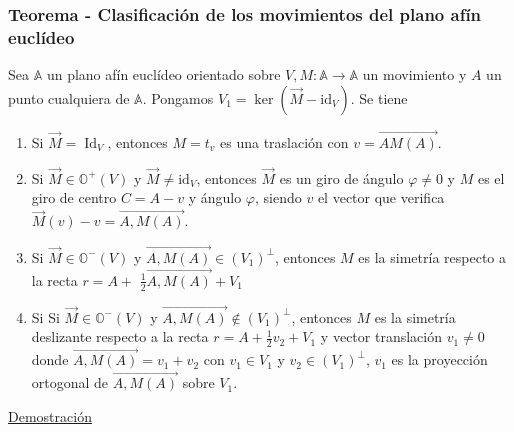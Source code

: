 \documentclass[12pt, a4paper, ones, notitlepage, openany,titlepage]{article}
\newcommand{\demostracion}{\noindent\underline{Demostración}}
\begin{document}
\subsubsection{Teorema - Clasificación de los movimientos del plano afín euclídeo}
Sea $\mathbb{A}$ un plano afín euclídeo orientado sobre $V, M: \mathbb{A} \rightarrow \mathbb{A}$ un movimiento y $A$ un punto cualquiera de $\mathbb{A}$. Pongamos $V_{1}=\ker\left(\overrightarrow{M}-\mathrm{id}_{V}\right)$. Se tiene
\begin{enumerate}[label=(\arabic*)]
	
\item Si $\overrightarrow{M}=\operatorname{Id}_{V}$, entonces $M=t_{v}$ es una traslación con $v=\overrightarrow{A M(A)}$.

\item Si $\overrightarrow{M} \in \mathbb{O}^{+}(V)$ y $\overrightarrow{M} \neq \mathrm{id}_{V}$, entonces $\overrightarrow{M}$ es un giro de ángulo $\varphi \neq 0$ y $M$ es el giro de centro $C=A-v$ y ángulo $\varphi$, siendo $v$ el vector que verifica $\overrightarrow{M}(v)-v=\overrightarrow{A,M(A)}$.

\item Si $\overrightarrow{M} \in \mathbb{O}^{-}(V)$ y $\overrightarrow{A,M(A)} \in\left(V_{1}\right)^{\perp}$, entonces $M$ es la simetría respecto a la recta $r=A+$ $\frac{1}{2} \overrightarrow{A,M(A)}+V_{1}$

\item Si Si $\overrightarrow{M} \in \mathbb{O}^{-}(V)$ y $\overrightarrow{A,M(A)} \notin\left(V_{1}\right)^{\perp}$, entonces $M$ es la simetría deslizante respecto a la recta $r = A + \frac{1}{2} v_2 + V_1$ y vector translación $v_1 \neq 0$ donde $\overrightarrow{A,M(A)} = v_1 + v_2$ con $v_1 \in V_1$ y $v_2 \in (V_1)^\perp$, $v_1$ es la proyección ortogonal de $\overrightarrow{A,M(A)}$ sobre $V_1$.
\end{enumerate}
\demostracion
\end{document}
